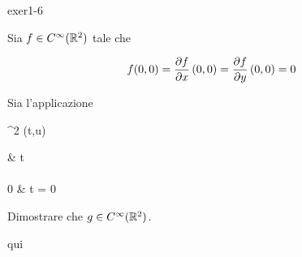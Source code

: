{exer1-6}
{
Sia $ f \in C^{\infty} (\mathbb{R}^{2}) $ tale che

\begin{equation}
	f(0,0) = \pdv{f}{x} \, (0,0) = \pdv{f}{y} \, (0,0) = 0
\end{equation}

Sia l'applicazione

	{\R^{2}}{\R}
	{(t,u)}{%
			\begin{cases}
				 & t  \\ \\
				0 & t = 0
			\end{cases}
			}

Dimostrare che $ g \in C^{\infty}(\mathbb{R}^{2}) $.
}
{
qui
}


